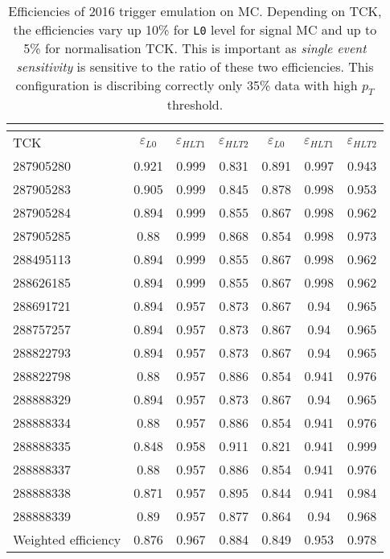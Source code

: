 \begin{table}[ht]
\footnotesize
\begin{center}
\begin{tabular}{ l |  c  c  c | c  c  c }
	\multicolumn{1}{c|}{} & \multicolumn{3}{c|}{\Bmumumu } & \multicolumn{3}{c}{\bjpsimumuk} \\ \hline
 TCK & $\varepsilon_{L0}$ & $\varepsilon_{HLT1}$ & $\varepsilon_{HLT2}$ & $\varepsilon_{L0}$ & $\varepsilon_{HLT1}$ & $\varepsilon_{HLT2}$ \\
\hline
287905280 & 0.921 & 0.999 & 0.831 & 0.891 & 0.997 & 0.943 \\
287905283 & 0.905 & 0.999 & 0.845 & 0.878 & 0.998 & 0.953 \\
287905284 & 0.894 & 0.999 & 0.855 & 0.867 & 0.998 & 0.962 \\
287905285 & 0.88 & 0.999 & 0.868 & 0.854 & 0.998 & 0.973 \\
288495113 & 0.894 & 0.999 & 0.855 & 0.867 & 0.998 & 0.962 \\
288626185 & 0.894 & 0.999 & 0.855 & 0.867 & 0.998 & 0.962 \\
288691721 & 0.894 & 0.957 & 0.873 & 0.867 & 0.94 & 0.965 \\
288757257 & 0.894 & 0.957 & 0.873 & 0.867 & 0.94 & 0.965 \\
288822793 & 0.894 & 0.957 & 0.873 & 0.867 & 0.94 & 0.965 \\
288822798 & 0.88 & 0.957 & 0.886 & 0.854 & 0.941 & 0.976 \\
288888329 & 0.894 & 0.957 & 0.873 & 0.867 & 0.94 & 0.965 \\
288888334 & 0.88 & 0.957 & 0.886 & 0.854 & 0.941 & 0.976 \\
288888335 & 0.848 & 0.958 & 0.911 & 0.821 & 0.941 & 0.999 \\
288888337 & 0.88 & 0.957 & 0.886 & 0.854 & 0.941 & 0.976 \\
288888338 & 0.871 & 0.957 & 0.895 & 0.844 & 0.941 & 0.984 \\
288888339 & 0.89 & 0.957 & 0.877 & 0.864 & 0.94 & 0.968 \\
\hline
Weighted efficiency & 0.876 & 0.967 & 0.884 & 0.849 & 0.953 & 0.978 \\
\hline
\end{tabular}
\end{center}
\caption{Efficiencies of 2016 trigger emulation on MC. Depending on TCK, the efficiencies vary up 10\% for \texttt{L0} level for signal MC and up to 5\% for normalisation TCK. This is important as \textit{single event sensitivity} is sensitive to the ratio of these two efficiencies. This configuration is discribing correctly only 35\% data with high $p_{T}$ threshold.}
\label{tab:L0andHLT1Calib}
\end{table}



